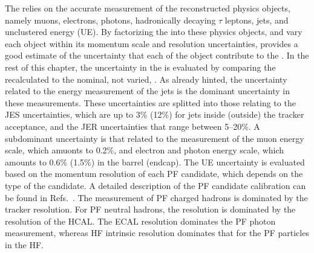 The \ptmiss relies on the accurate measurement of the reconstructed physics objects, namely muons, electrons, photons, hadronically decaying $\tau$ leptons, jets, and unclustered energy (UE). 
By factorizing the \ptmiss into these physics objects, and vary each object within its momentum scale and resolution uncertainties, provides a good estimate of the uncertainty that each of the object contribute to the \ptmiss. 
In the rest of this chapter, the uncertainty in the \ptmiss is evaluated by comparing the recalculated \ptmiss to the nominal, not varied, \ptmiss. 
As already hinted, the uncertainty related to the energy measurement of the jets is the dominant uncertainty in these measurements. 
These uncertainties are splitted into those relating to the JES uncertainties, which are up to 3\% (12\%) for jets inside (outside) the tracker acceptance, and the JER uncertainties that range between 5--20\%. 
A subdominant uncertainty is that related to the measurement of the muon energy scale, which amuonts to 0.2\%, and electron and photon energy scale, which amounts to 0.6\% (1.5\%) in the barrel (endcap). 
The UE uncertainty is evaluated based on the momentum resolution of each PF candidate, which depends on the type of the candidate. 
A detailed description of the PF candidate calibration can be found in Refs.~\cite{Sirunyan:2017ulk,TRK-11-001,CMS:EGM-14-001}.  
The \pt measurement of PF charged hadrons is dominated by the tracker resolution. 
For PF neutral hadrons, the \pt resolution is dominated by the resolution of the HCAL. 
The ECAL resolution dominates the PF photon \pt measurement, whereas HF intrinsic resolution dominates that for the PF particles in the HF. 
